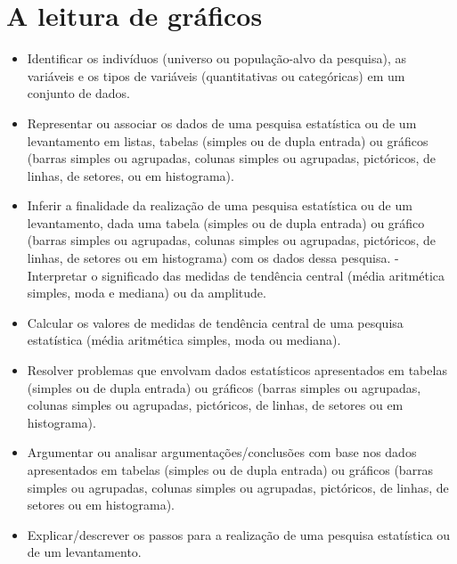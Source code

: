 {%

\chapter{A leitura de gráficos}

\begin{itemize}
\item Identificar os indivíduos (universo ou
população-alvo da pesquisa), as variáveis e os tipos de variáveis
(quantitativas ou categóricas) em um conjunto de dados.
\item
  Representar ou associar os dados de uma pesquisa estatística ou de um
  levantamento em listas, tabelas (simples ou de dupla entrada) ou
  gráficos (barras simples ou agrupadas, colunas simples ou agrupadas,
  pictóricos, de linhas, de setores, ou em histograma).
\item
  Inferir a finalidade da realização de uma pesquisa estatística ou de
  um levantamento, dada uma tabela (simples ou de dupla entrada) ou
  gráfico (barras simples ou agrupadas, colunas simples ou agrupadas,
  pictóricos, de linhas, de setores ou em histograma) com os dados dessa
  pesquisa. - Interpretar o significado das medidas de tendência central
  (média aritmética simples, moda e mediana) ou da amplitude.
\item
  Calcular os valores de medidas de tendência central de uma pesquisa
  estatística (média aritmética simples, moda ou mediana).
\item
  Resolver problemas que envolvam dados estatísticos apresentados em
  tabelas (simples ou de dupla entrada) ou gráficos (barras simples ou
  agrupadas, colunas simples ou agrupadas, pictóricos, de linhas, de
  setores ou em histograma).
\item
  Argumentar ou analisar argumentações/conclusões com base nos dados
  apresentados em tabelas (simples ou de dupla entrada) ou gráficos
  (barras simples ou agrupadas, colunas simples ou agrupadas,
  pictóricos, de linhas, de setores ou em histograma).
\item
  Explicar/descrever os passos para a realização de uma pesquisa
  estatística ou de um levantamento.
\end{itemize}

}
